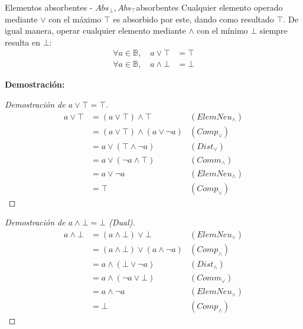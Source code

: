 \documentclass[12pt,a4paper]{article}
\newcommand{\desplegable}[2]{%
  \par\vspace{1ex}\noindent
  \textbf{Demostración:}
  \vspace{1ex}
  
  #2
  \par\vspace{1ex}
}
\begin{document}
\begin{teorema}{Elementos absorbentes - $Abs_{\bot}, Abs_{\top}$}{absorbentes}
Cualquier elemento operado mediante $\vee$ con el máximo $\top$ es absorbido por este, dando como resultado $\top$. De igual manera, operar cualquier elemento mediante $\wedge$ con el mínimo $\bot$ siempre resulta en $\bot$:
\begin{align*}
    \forall a \in \mathbb{B}, \quad a \vee \top &= \top \\
    \forall a \in \mathbb{B}, \quad a \wedge \bot &= \bot
\end{align*}
\end{teorema}
\desplegable{proof_absorbentes}{
\begin{proof}[Demostración de $a \vee \top = \top$]
\begin{align*}
    a \vee \top &= (a \vee \top) \wedge \top & (ElemNeu_\wedge) \\
               &= (a \vee \top) \wedge (a \vee \neg a) & (Comp_\vee) \\
               &= a \vee (\top \wedge \neg a) & (Dist_\vee) \\
               &= a \vee (\neg a \wedge \top) & (Comm_\wedge) \\
               &= a \vee \neg a & (ElemNeu_\wedge) \\
               &= \top & (Comp_\vee)
\end{align*}
\end{proof}
\begin{proof}[Demostración de $a \wedge \bot = \bot$ (Dual)]
\begin{align*}
    a \wedge \bot &= (a \wedge \bot) \vee \bot & (ElemNeu_\vee) \\
               &= (a \wedge \bot) \vee (a \wedge \neg a) & (Comp_\wedge) \\
               &= a \wedge (\bot \vee \neg a) & (Dist_\wedge) \\
               &= a \wedge (\neg a \vee \bot) & (Comm_\vee) \\
               &= a \wedge \neg a & (ElemNeu_\vee) \\
               &= \bot & (Comp_\wedge)
\end{align*}
\end{proof}
}
\end{document}
